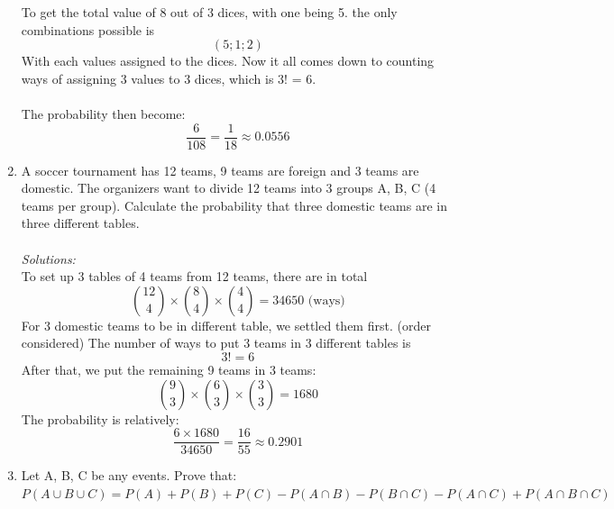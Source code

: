 \documentclass[a4paper]{article}
\begin{document}
\begin{enumerate}
\begin{equation*}
	      \end{equation*}
	      To get the total value of 8 out of 3 dices, with one being 5. the only combinations possible is 
	      \begin{equation*}
		      (5;1;2)
	      \end{equation*}
	      With each values assigned to the dices. Now it all comes down to counting ways of assigning 3 values to 3 dices, which is 3! = 6.\\\\
	      The probability then become:
	      \begin{equation*}
		      \frac{6}{108} = \frac{1}{18} \approx 0.0556 
	      \end{equation*}
	\item A soccer tournament has 12 teams, 9 teams are foreign and 3 teams are domestic. The organizers want to divide 12 teams into 3 groups A, B, C (4 teams per group). Calculate the probability that three domestic teams are in three different tables.\\\\
	      \textit{Solutions:} \\
	      To set up 3 tables of 4 teams from 12 teams, there are in total
	      \begin{equation*}
		      {12\choose4}\times{8\choose4}\times{4\choose4} = 34650 \text{ (ways)}
	      \end{equation*}
	      For 3 domestic teams to be in different table, we settled them first. (order considered) The number of ways to put 3 teams in 3 different tables is
	      \begin{equation*}
		      3! = 6
	      \end{equation*}
	      After that, we put the remaining 9 teams in 3 teams:
	      \begin{equation*}
		      {9\choose3}\times{6\choose3}\times{3\choose3} = 1680	\end{equation*}
	      The probability is relatively: 
	      \begin{equation*}
		      \frac{6\times1680}{34650} = \frac{16}{55} \approx 0.2901
	      \end{equation*}
	\item Let A, B, C be any events. Prove that: \\
	      \begin{math}
		      P(A \cup B \cup C) = P(A) + P(B) + P(C) - P(A \cap B) - P(B \cap C) - P(A \cap C) + P(A \cap B \cap C)
	      \end{math}\\

\end{enumerate}
\end{document}
